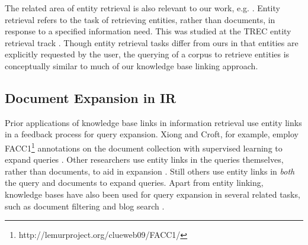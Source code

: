 \documentclass{sig-alternate}
\begin{document}
The related area of entity retrieval is also relevant to our work, e.g. \cite{Adafre2007, Bron2010}. Entity retrieval refers to the task of retrieving entities, rather than documents, in response to a specified information need. This was studied at the TREC entity retrieval track \cite{Balog2011}. Though entity retrieval tasks differ from ours in that entities are explicitly requested by the user, the querying of a corpus to retrieve entities is conceptually similar to much of our knowledge base linking approach.

\subsection{Document Expansion in IR}\label{section.related.ir}

Prior applications of knowledge base links in information retrieval use entity links in a feedback process for query expansion. Xiong and Croft, for example, employ FACC1\footnote{http://lemurproject.org/clueweb09/FACC1/} annotations on the document collection with supervised learning to expand queries \cite{Xiong2015}. Other researchers use entity links in the queries themselves, rather than documents, to aid in expansion \cite{Xu2009, Brandao2014}. Still others use entity links in \textit{both} the query and documents \cite{Dalton2014, Li2015} to expand queries. Apart from entity linking, knowledge bases have also been used for query expansion in several related tasks, such as document filtering \cite{Xie2015} and blog search \cite{Elsas2008, Weerkamp2009}.

\end{document}
